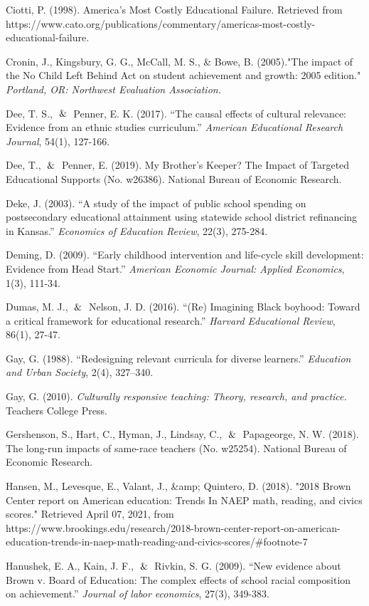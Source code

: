 \begin{hangparas}{.25in}{1}
Ciotti, P. (1998). America’s Most Costly Educational Failure. Retrieved from https://www.cato.org/publications/commentary/americas-most-costly-educational-failure.

Cronin, J., Kingsbury, G. G., McCall, M. S., & Bowe, B. (2005)."The impact of the No Child Left Behind Act on student achievement and growth: 2005 edition." \textit{Portland, OR: Northwest Evaluation Association.}

Dee, T. S., $\And$ Penner, E. K. (2017). “The causal effects of cultural relevance: Evidence from an ethnic studies curriculum.” \textit{American Educational Research Journal}, 54(1), 127-166.

Dee, T., $\And$ Penner, E. (2019). My Brother’s Keeper? The Impact of Targeted Educational Supports (No. w26386). National Bureau of Economic Research.

Deke, J. (2003). “A study of the impact of public school spending on postsecondary educational attainment using statewide school district refinancing in Kansas.” \textit{Economics of Education Review}, 22(3), 275-284.

Deming, D. (2009). “Early childhood intervention and life-cycle skill development: Evidence 
from Head Start.” \textit{American Economic Journal: Applied Economics}, 1(3), 111-34.

Dumas, M. J., $\And$ Nelson, J. D. (2016). “(Re) Imagining Black boyhood: Toward a critical framework for educational research.” \textit{Harvard Educational Review}, 86(1), 27-47.

Gay, G. (1988). “Redesigning relevant curricula for diverse learners.” \textit{Education and Urban Society}, 2(4), 327–340.

Gay, G. (2010). \textit{Culturally responsive teaching: Theory, research, and practice.} Teachers College Press.

Gershenson, S., Hart, C., Hyman, J., Lindsay, C., $\And$ Papageorge, N. W. (2018). The long-run impacts of same-race teachers (No. w25254). National Bureau of Economic Research.

Hansen, M., Levesque, E., Valant, J., &amp; Quintero, D. (2018). "2018 Brown Center report on American education: Trends In NAEP math, reading, and civics scores." Retrieved April 07, 2021, from https://www.brookings.edu/research/2018-brown-center-report-on-american-education-trends-in-naep-math-reading-and-civics-scores/#footnote-7

Hanushek, E. A., Kain, J. F., $\And$ Rivkin, S. G. (2009). “New evidence about Brown v. Board of Education: The complex effects of school racial composition on achievement.” \textit{Journal of labor economics}, 27(3), 349-383.


\end{hangparas}
